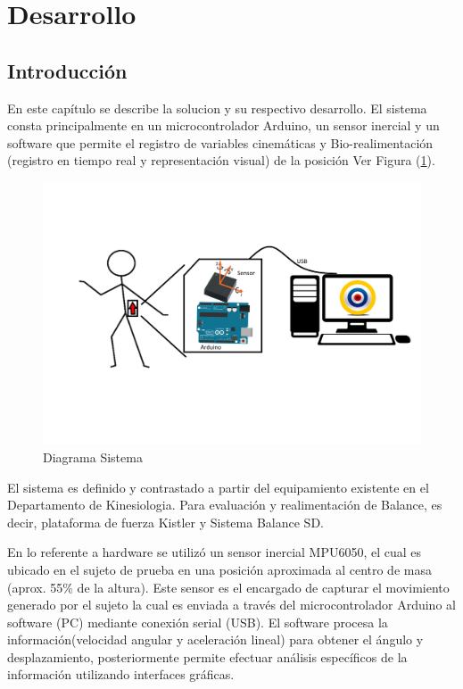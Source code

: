 \documentclass[12pt,a4paper]{article}
\begin{document}
\section{Desarrollo}
\subsection{Introducción}
En este capítulo se describe la solucion y su respectivo desarrollo.
El sistema consta principalmente en un microcontrolador Arduino, un sensor inercial y un software que permite el registro de variables cinemáticas y Bio-realimentación (registro en tiempo real y representación visual) de la posición Ver Figura (\ref{fig:diagramasistema}).

\begin{figure}[H]
	\centering
	\includegraphics[scale=0.25]{images/diagrama_sistema}
	\caption{Diagrama Sistema}
	\label{fig:diagramasistema}
\end{figure}

El sistema es definido y contrastado a partir del equipamiento existente en el Departamento de Kinesiologia. Para evaluación y realimentación de Balance, es decir, plataforma de fuerza Kistler y Sistema Balance SD.

En lo referente a hardware se utilizó un sensor inercial MPU6050, el cual es ubicado en el sujeto de prueba en una posición aproximada al centro de masa (aprox. 55\% de la altura). Este sensor es el encargado de capturar el movimiento generado por el sujeto la cual es  enviada a través del microcontrolador Arduino al software (PC) mediante conexión serial (USB). El software procesa la información(velocidad angular y aceleración lineal) para obtener el ángulo y desplazamiento, posteriormente permite efectuar análisis específicos de la información utilizando interfaces gráficas.
\end{document}
